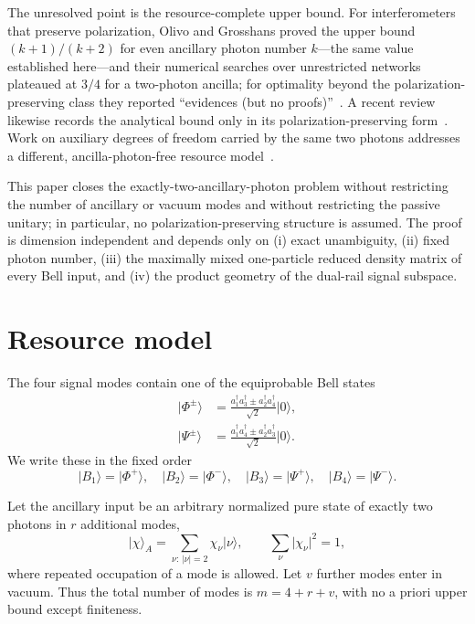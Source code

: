 \documentclass[11pt]{article}
\theoremstyle{remark}
\newcommand{\ket}[1]{\lvert #1\rangle}
\newcommand{\abs}[1]{\lvert #1\rvert}
\begin{document}
The unresolved point is the resource-complete upper bound. For
interferometers that preserve polarization, Olivo and Grosshans proved the
upper bound \((k+1)/(k+2)\) for even ancillary photon number \(k\)---the same
value established here---and their numerical searches over unrestricted
networks plateaued at \(3/4\) for a two-photon ancilla; for optimality beyond
the polarization-preserving class they reported ``evidences (but no
proofs)''~\cite{Olivo2018}. A recent review likewise records the analytical
bound only in its polarization-preserving form~\cite{Bianchi2025}. Work on
auxiliary degrees of freedom carried by the same two photons addresses a
different, ancilla-photon-free resource model~\cite{Laha2026}.

This paper closes the exactly-two-ancillary-photon problem without restricting
the number of ancillary or vacuum modes and without restricting the passive
unitary; in particular, no polarization-preserving structure is assumed. The proof is dimension independent and depends only on (i) exact
unambiguity, (ii) fixed photon number, (iii) the maximally mixed one-particle
reduced density matrix of every Bell input, and (iv) the product geometry of the
dual-rail signal subspace.


\section{Resource model}
\label{sec:model}

The four signal modes contain one of the equiprobable Bell states
\begin{align}
\ket{\Phi^\pm}
  &=\frac{a_1^\dagger a_3^\dagger\pm a_2^\dagger a_4^\dagger}{\sqrt2}\ket0,
  \\
\ket{\Psi^\pm}
  &=\frac{a_1^\dagger a_4^\dagger\pm a_2^\dagger a_3^\dagger}{\sqrt2}\ket0.
\end{align}
We write these in the fixed order
\[
\ket{B_1}=\ket{\Phi^+},\quad
\ket{B_2}=\ket{\Phi^-},\quad
\ket{B_3}=\ket{\Psi^+},\quad
\ket{B_4}=\ket{\Psi^-}.
\]

Let the ancillary input be an arbitrary normalized pure state of exactly two
photons in \(r\) additional modes,
\begin{equation}
  \ket\chi_A=\sum_{\nu:\,|\nu|=2}\chi_\nu\ket\nu,
  \qquad \sum_{\nu}\abs{\chi_\nu}^2=1,
\end{equation}
where repeated occupation of a mode is allowed. Let \(v\) further modes enter
in vacuum. Thus the total number of modes is \(m=4+r+v\), with no a priori
upper bound except finiteness.
\end{document}
